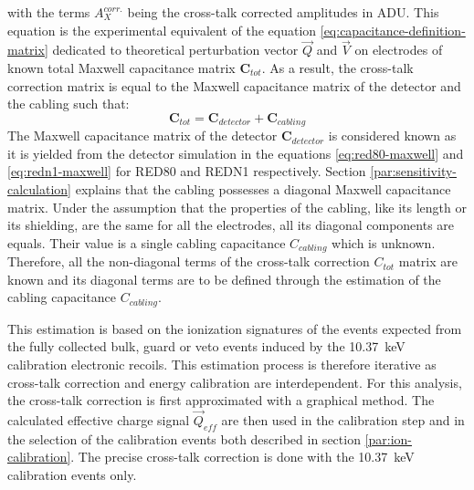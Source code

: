 with the terms $A_X^{corr.}$ being the cross-talk corrected amplitudes in ADU.
This equation is the experimental equivalent of the equation \ref{eq:capacitance-definition-matrix} dedicated to theoretical perturbation vector $\vec{Q}$ and $\vec{V}$ on electrodes of known total Maxwell capacitance matrix $\bm{C}_{tot}$. As a result, the cross-talk correction matrix is equal to the Maxwell capacitance matrix of the detector and the cabling such that:
\begin{equation}
\bm{C}_{tot} = \bm{C}_{detector} + \bm{C}_{cabling} 
\end{equation}
The Maxwell capacitance matrix of the detector $\bm{C}_{detector}$ is considered known as it is yielded from the detector simulation in the equations \ref{eq:red80-maxwell} and \ref{eq:redn1-maxwell} for RED80 and REDN1 respectively.
Section \ref{par:sensitivity-calculation} explains that the cabling possesses a diagonal Maxwell capacitance matrix. Under the assumption that the properties of the cabling, like its length or its shielding, are the same for all the electrodes, all its diagonal components are equals. Their value is a single cabling capacitance $C_{cabling}$ which is unknown.
Therefore, all the non-diagonal terms of the cross-talk correction $C_{tot}$ matrix are known and its diagonal terms are to be defined through the estimation of the cabling capacitance $C_{cabling}$.

This estimation is based on the ionization signatures of the events expected from the fully collected bulk, guard or veto events induced by the \SI{10.37}{\kilo\eV} calibration electronic recoils. This estimation process is therefore iterative as cross-talk correction and energy calibration are interdependent. 
For this analysis, the cross-talk correction is first approximated with a graphical method. The calculated effective charge signal $\vec{Q}_{eff}$ are then used in the calibration step and in the selection of the calibration events both described in section \ref{par:ion-calibration}. The precise cross-talk correction is done with the \SI{10.37}{\kilo\eV} calibration events only.

